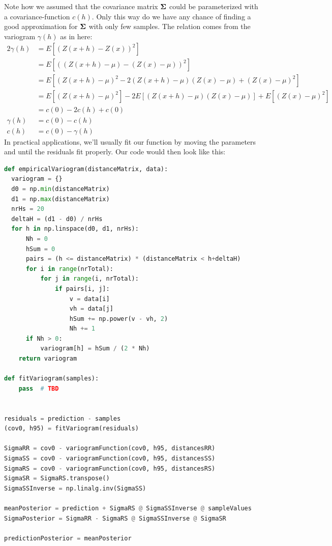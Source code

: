 Note how we assumed that the covariance matrix $\mathbf{\Sigma}$ could be parameterized with a covariance-function $c(h)$. Only this way do we have any chance of finding a good approximation for $\mathbf{\Sigma}$ with only few samples.
The relation  comes from the variogram $\gamma(h)$ as in here:
\begin{equation}
  \begin{aligned}
    2 \gamma(h) &= E[(Z(x+h) - Z(x))^2] \\
                &= E[( (Z(x+h) - \mu) - (Z(x) - \mu) )^2] \\
                &= E[ (Z(x+h) - \mu)^2  - 2(Z(x+h) - \mu)(Z(x) - \mu)  + (Z(x) - \mu)^2 ] \\
                &= E[ (Z(x+h) - \mu)^2 ]  - 2 E[(Z(x+h) - \mu)(Z(x) - \mu)]  + E[ (Z(x) - \mu)^2 ] \\
                &= c(0) - 2 c(h) + c(0) \\
      \gamma(h) &= c(0) - c(h) \\
           c(h) &= c(0) - \gamma(h)
  \end{aligned}
\end{equation}
In practical applications, we'll usually fit our function  by moving the parameters  and  until the residuals fit properly.
Our code would then look like this:

\begin{lstlisting}[language=python]
def empiricalVariogram(distanceMatrix, data):
  variogram = {}
  d0 = np.min(distanceMatrix)
  d1 = np.max(distanceMatrix)
  nrHs = 20
  deltaH = (d1 - d0) / nrHs
  for h in np.linspace(d0, d1, nrHs):
      Nh = 0
      hSum = 0
      pairs = (h <= distanceMatrix) * (distanceMatrix < h+deltaH)
      for i in range(nrTotal):
          for j in range(i, nrTotal):
              if pairs[i, j]:
                  v = data[i]
                  vh = data[j]
                  hSum += np.power(v - vh, 2)
                  Nh += 1
      if Nh > 0:
          variogram[h] = hSum / (2 * Nh)
    return variogram
    
def fitVariogram(samples):
    pass  # TBD


residuals = prediction - samples
(cov0, h95) = fitVariogram(residuals)

SigmaRR = cov0 - variogramFunction(cov0, h95, distancesRR)
SigmaSS = cov0 - variogramFunction(cov0, h95, distancesSS)
SigmaRS = cov0 - variogramFunction(cov0, h95, distancesRS)
SigmaSR = SigmaRS.transpose()
SigmaSSInverse = np.linalg.inv(SigmaSS)

meanPosterior = prediction + SigmaRS @ SigmaSSInverse @ sampleValues
SigmaPosterior = SigmaRR - SigmaRS @ SigmaSSInverse @ SigmaSR

predictionPosterior = meanPosterior
\end{lstlisting}


